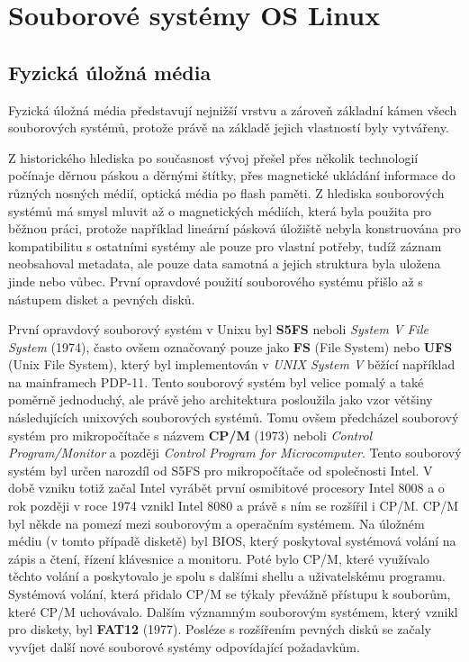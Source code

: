 \chapter{Souborové systémy OS Linux}

\section{Fyzická úložná média}
Fyzická úložná média představují nejnižší vrstvu  a zároveň základní kámen všech souborových systémů, protože právě na základě jejich vlastností byly vytvářeny.

Z historického hlediska po současnost vývoj přešel přes několik technologií počínaje děrnou páskou a děrnými štítky, přes magnetické ukládání informace do různých nosných médií, optická média po flash paměti. Z hlediska souborových systémů má smysl mluvit až o magnetických médiích, která byla použita pro běžnou práci, protože například lineární pásková úložiště nebyla konstruována pro kompatibilitu s ostatními systémy ale pouze pro vlastní potřeby, tudíž záznam neobsahoval metadata, ale pouze data samotná a jejich struktura byla uložena jinde nebo vůbec. První opravdové použití souborového systému přišlo až s nástupem disket a pevných disků. 

První opravdový souborový systém v Unixu byl \textbf{S5FS} neboli \emph{System V File System} (1974), často ovšem označovaný pouze jako \textbf{FS} (File System) nebo \textbf{UFS} (Unix File System), který byl implementován v \emph{UNIX System V} běžící například na mainframech PDP-11. Tento souborový systém byl velice pomalý a také poměrně jednoduchý, ale právě jeho architektura posloužila jako vzor většiny následujících unixových souborových systémů. Tomu ovšem předcházel souborový systém pro mikropočítače s názvem \textbf{CP/M} (1973) neboli \emph{Control Program/Monitor} a později \emph{Control Program for Microcomputer}. Tento souborový systém byl určen narozdíl od S5FS pro mikropočítače od společnosti Intel. V době vzniku totiž začal Intel vyrábět první osmibitové procesory Intel 8008 a o rok později v roce 1974 vznikl Intel 8080 a právě s ním se rozšířil i CP/M. CP/M byl někde na pomezí mezi souborovým a operačním systémem. Na úložném médiu (v tomto případě disketě) byl BIOS, který poskytoval systémová volání na zápis a čtení, řízení klávesnice a monitoru. Poté bylo CP/M, které využívalo těchto volání a poskytovalo je spolu s dalšími shellu a uživatelskému programu. Systémová volání, která přidalo CP/M se týkaly převážně přístupu k souborům, které CP/M uchovávalo. Dalším významným souborovým systémem, který vznikl pro diskety, byl \textbf{FAT12} (1977). Posléze s rozšířením pevných disků se začaly vyvíjet další nové souborové systémy odpovídající požadavkům.

